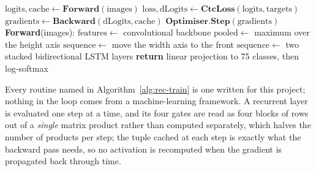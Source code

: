 \begin{algorithm}[!htbp]
\caption{One training step and the forward pass it calls}
\label{alg:rec-train}
\begin{algorithmic}[1]
    \STATE $\mathrm{logits},\mathrm{cache}\leftarrow\textbf{Forward}(\mathrm{images})$
    \STATE $\mathrm{loss},\mathrm{dLogits}\leftarrow\textbf{CtcLoss}(\mathrm{logits},\mathrm{targets})$ 
    \STATE $\mathrm{gradients}\leftarrow\textbf{Backward}(\mathrm{dLogits},\mathrm{cache})$
    \STATE $\textbf{Optimiser.Step}(\mathrm{gradients})$
\ENDFOR
\STATE
\STATE \textbf{Forward}(images):
\STATE \quad $\mathrm{features}\leftarrow$ convolutional backbone 
\STATE \quad $\mathrm{pooled}\leftarrow$ maximum over the height axis 
\STATE \quad $\mathrm{sequence}\leftarrow$ move the width axis to the front 
\STATE \quad $\mathrm{sequence}\leftarrow$ two stacked bidirectional LSTM layers
\STATE \quad \textbf{return} linear projection to 75 classes, then log-softmax
\end{algorithmic}
\end{algorithm}

Every routine named in Algorithm~\ref{alg:rec-train} is one written for this project; nothing in the loop comes from a machine-learning framework. A recurrent layer is evaluated one step at a time, and its four gates are read as four blocks of rows out of a \emph{single} matrix product rather than computed separately, which halves the number of products per step; the tuple cached at each step is exactly what the backward pass needs, so no activation is recomputed when the gradient is propagated back through time.

